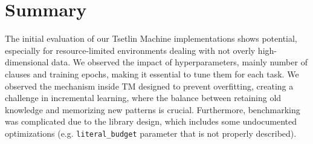 \clearpage
\section{Summary}
The initial evaluation of our Tsetlin Machine implementations shows potential, especially for resource-limited environments dealing with not overly high-dimensional data. We observed the impact of hyperparameters, mainly number of clauses and training epochs, making it essential to tune them for each task. We observed the mechanism inside TM designed to prevent overfitting, creating a challenge in incremental learning, where the balance between retaining old knowledge and memorizing new patterns is crucial. Furthermore, benchmarking was complicated due to the \GreenTsetlinName library design, which includes some undocumented optimizations (e.g. \texttt{literal\_budget} parameter that is not properly described).